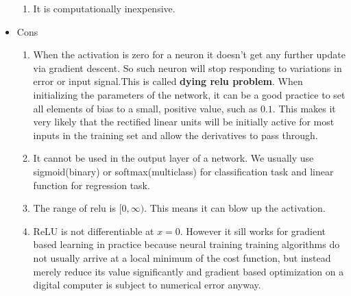 \documentclass{article}
\begin{document}
\begin{itemize}
\begin{enumerate}
        \item It is computationally inexpensive.
    \end{enumerate}
    \item Cons
    \begin{enumerate}
        \item When the activation is zero for a neuron it doesn't get any further update via gradient descent. So such neuron will stop responding to variations in error or input signal.This is called \textbf{dying relu problem}. When initializing the parameters of the network, it can be a good practice to set all elements of bias to a small, positive value, such as $0.1$. This makes it very likely that the rectified linear units will be initially active for most inputs in the training set and allow the derivatives to pass through.
        \item It cannot be used in the output layer of a network. We usually use sigmoid(binary) or softmax(multiclass) for classification task and linear function for regression task.
        \item The range of relu is $[0, \infty)$. This means it can blow up the activation.
        \item ReLU is not differentiable at $x=0$. However it sill works for gradient based learning in practice because neural training training algorithms do not usually arrive at a local minimum of the cost function, but instead merely reduce its value significantly and gradient based optimization on a digital computer is subject to numerical error anyway.  
    \end{enumerate}
\end{itemize}
\end{document}
